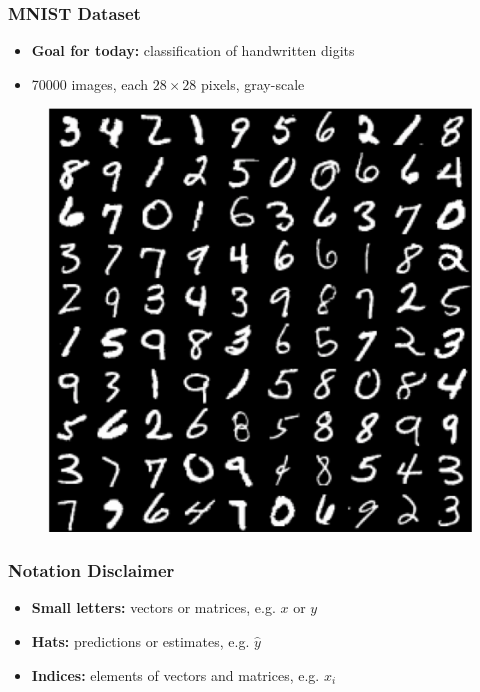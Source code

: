 \documentclass[aspectratio=169]{beamer}
\begin{document}
\begin{frame}
\frametitle{MNIST Dataset}

\begin{itemize}
\item \textbf{Goal for today:} classification of handwritten digits
\item 70000 images, each $28\times 28$ pixels, gray-scale
\end{itemize}

\begin{figure}
\includegraphics[height=0.6\textheight]{mnist.png}
\end{figure}
\end{frame}

\begin{frame}
\frametitle{Notation Disclaimer}
\begin{itemize}
    \item \textbf{Small letters:} vectors or matrices, e.g. $x$ or $y$
    \item \textbf{Hats:} predictions or estimates, e.g. $\hat{y}$
    \item \textbf{Indices:} elements of vectors and matrices, e.g. $x_{i}$
\end{itemize}

\medskip
\end{frame}
\end{document}
